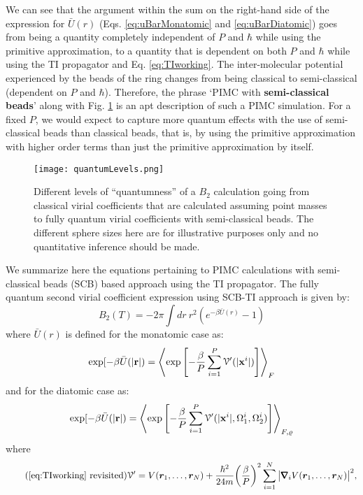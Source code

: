         We can see that the argument within the sum on the right-hand side of the expression for $\bar{U} (r)$ (Eqs. \eqref{eq:uBarMonatomic} and \eqref{eq:uBarDiatomic}) goes from being a quantity completely independent of $P$ and $\hbar$ while using the primitive approximation, to a quantity that is dependent on both $P$ and $\hbar$ while using the TI propagator and Eq. \eqref{eq:TIworking}. The inter-molecular potential experienced by the beads of the ring changes from being classical to semi-classical (dependent on $P$ and $\hbar$). Therefore, the phrase `PIMC with \textbf{semi-classical beads}' along with Fig. \ref{quantumness} is an apt description of such a PIMC simulation. For a fixed $P$, we would expect to capture more quantum effects with the use of semi-classical beads than classical beads, that is, by using the primitive approximation with higher order terms than just the primitive approximation by itself.
        \begin{figure}
            \centering
            \texttt{[image: quantumLevels.png]}
            \caption{Different levels of ``quantumness'' of a $B_2$ calculation going from classical virial coefficients that are calculated assuming point masses to fully quantum virial coefficients with semi-classical beads. The different sphere sizes here are for illustrative purposes only and no quantitative inference should be made.} \label{quantumness}
        \end{figure}
        
        We summarize here the equations pertaining to PIMC calculations with semi-classical beads (SCB) based approach using the TI propagator.
        The fully quantum second virial coefficient expression using SCB-TI approach is given by:
        \begin{equation}
        \label{eq:b2SCBTI}
            B_2 (T) = -2 \pi \displaystyle\int dr~ r^2 (e^{-\beta \bar{U} (r)} - 1)
        \end{equation}
        where $\bar {U} (r)$ is defined for the monatomic case as:
        \begin{equation}
            \label{eq:uBarMonatomicSCBTI}
            \exp [-\beta \bar{U} (|{\mathbf {r}}|) = \left< \exp \left[ -\displaystyle\frac{\beta}{P} \sum_{i=1}^P \mathcal{V'} (|{\mathbf {x}}^i|) \right] \right>_F
        \end{equation}
        and for the diatomic case as:
        \begin{equation}
            \label{eq:uBarDiatomicSCBTI}
            \exp [-\beta \bar{U} (|{\mathbf {r}}|) = \left< \exp \left[ -\displaystyle\frac{\beta}{P} \sum_{i=1}^P \mathcal{V'} (|{\mathbf {x}}^i|,\Omega_1^i,\Omega_2^i) \right] \right>_{F,\varrho}
        \end{equation}
        where
        \begin{equation}
        \tag{\eqref{eq:TIworking} revisited}
            \mc{V'} = V (\bm{r}_1, \ldots ,\bm{r}_N) + \frac{\hbar^2}{24m} \bigg(\frac{\beta}{P} \bigg)^2 \displaystyle\sum\limits_{i=1}^N \big|\pmb{\nabla}_i V (\bm{r}_1, \ldots ,\bm{r}_N) \big|^2,
        \end{equation}

